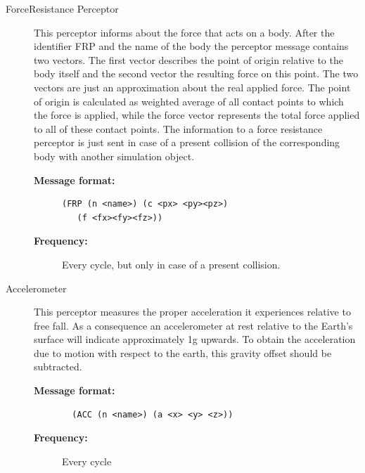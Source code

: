 \begin{description}
  \item [ForceResistance Perceptor]
  This perceptor informs about the force that acts on a body. After the identifier FRP and the name of the body the perceptor message contains two vectors. The first vector describes the point of origin relative to the body itself and the second vector the resulting force on this point. The two vectors are just an approximation about the real applied force. The point of origin is calculated as weighted average of all contact points to which the force is applied, while the force vector represents the total force applied to all of these contact points. The information to a force resistance perceptor is just sent in case of a present collision of the corresponding body with another simulation object.\cite{SimSpark}
 \begin{description}
  \item[{\bf Message format:}]
  \begin{verbatim}(FRP (n <name>) (c <px> <py><pz>)
   (f <fx><fy><fz>))
  \end{verbatim}
  \item[{\bf Frequency:}]
  Every cycle, but only in case of a present    		collision.
  \end{description}




  \item [Accelerometer]
  This perceptor measures the proper acceleration it experiences relative to free fall. As a consequence an accelerometer at rest relative to the Earth's surface will indicate approximately 1g upwards. To obtain the acceleration due to motion with respect to the earth, this gravity offset should be subtracted.\cite{SimSpark}
    \begin{description}
  \item[{\bf Message format:}]
  \begin{verbatim}
  (ACC (n <name>) (a <x> <y> <z>))
  \end{verbatim}
  \item[{\bf Frequency:}]
  Every cycle
  \end{description}
\end{description}

